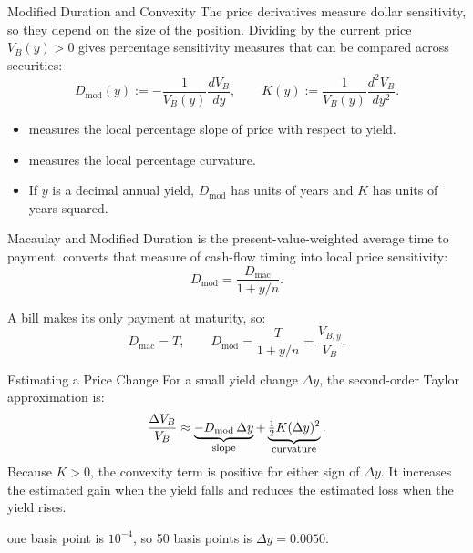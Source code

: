 \documentclass[aspectratio=169,11pt]{beamer}
\begin{document}
\begin{frame}{Modified Duration and Convexity}
  \vspace{0.2em}
  The price derivatives measure dollar sensitivity, so they depend on the size
  of the position. Dividing by the current price $V_B(y)>0$ gives percentage
  sensitivity measures that can be compared across securities:
  \[
    D_{\mathrm{mod}}(y):=-\frac{1}{V_B(y)}\frac{dV_B}{dy},
    \qquad
    K(y):=\frac{1}{V_B(y)}\frac{d^2V_B}{dy^2} .
  \]
  \begin{itemize}\setlength{\itemsep}{0.35em}
    \item {} measures the local
      percentage slope of price with respect to yield.
    \item {} measures the local percentage curvature.
    \item If $y$ is a decimal annual yield, $D_{\mathrm{mod}}$ has units of years
      and $K$ has units of years squared.
  \end{itemize}
\end{frame}

\begin{frame}{Macaulay and Modified Duration}
  \vspace{0.5em}
   is the present-value-weighted average time to
  payment.  converts that measure of cash-flow timing
  into local price sensitivity:
  \[
    D_{\mathrm{mod}}=\frac{D_{\mathrm{mac}}}{1+y/n}.
  \]

  \vspace{0.7em}
  A bill makes its only payment at maturity, so:
  \[
    D_{\mathrm{mac}}=T,
    \qquad
    D_{\mathrm{mod}}=\frac{T}{1+y/n}=\frac{V_{B,y}}{V_B}.
  \]
\end{frame}

\begin{frame}{Estimating a Price Change}
  \vspace{0.2em}
  For a small yield change $\Delta y$, the second-order Taylor approximation is:
  \[
    \frac{\Delta V_B}{V_B}\approx
    \underbrace{-D_{\mathrm{mod}}\,\Delta y}_{\text{\footnotesize slope}}
    +\underbrace{\tfrac{1}{2}K(\Delta y)^2}_{\text{\footnotesize curvature}} .
  \]
  Because $K>0$, the convexity term is positive for either sign of $\Delta y$.
  It increases the estimated gain when the yield falls and reduces the estimated
  loss when the yield rises.

  \vspace{0.4em}
   one basis point is $10^{-4}$, so 50 basis
  points is $\Delta y=0.0050$.

\end{frame}
\end{document}
